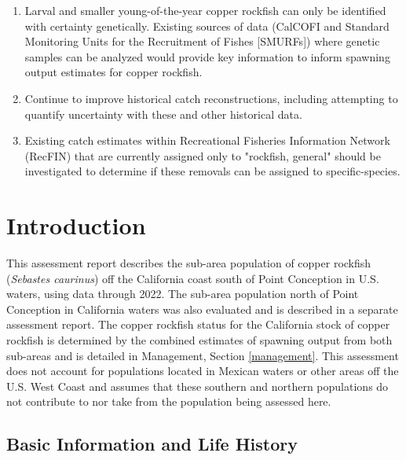 \documentclass[11pt,
  english,
  letterpaper,
]{article}
\begin{document}
\begin{enumerate}
 \item Larval and smaller young-of-the-year copper rockfish can only be identified with certainty genetically. Existing sources of data (CalCOFI and Standard Monitoring Units for the Recruitment of Fishes [SMURFs]) where genetic samples can be analyzed would provide key information to inform spawning output estimates for copper rockfish.
 
  \item Continue to improve historical catch reconstructions, including attempting to quantify uncertainty with these and other historical data.
  
  \item Existing catch estimates within Recreational Fisheries Information Network (RecFIN) that are currently assigned only to "rockfish, general" should be investigated to determine if these removals can be assigned to specific-species.



\end{enumerate}

\pagebreak
\setlength{\parskip}{5mm plus1mm minus1mm}
\setcounter{page}{1}
\renewcommand{\thefigure}{\arabic{figure}}
\renewcommand{\thetable}{\arabic{table}}
\setcounter{table}{0}
\setcounter{figure}{0}

\hypertarget{introduction}{%
\section{Introduction}\label{introduction}}

This assessment report describes the sub-area population of copper rockfish (\emph{Sebastes caurinus}) off the California coast south of Point Conception in U.S. waters, using data through 2022. The sub-area population north of Point Conception in California waters was also evaluated and is described in a separate assessment report. The copper rockfish status for the California stock of copper rockfish is determined by the combined estimates of spawning output from both sub-areas and is detailed in Management, Section \ref{management}. This assessment does not account for populations located in Mexican waters or other areas off the U.S. West Coast and assumes that these southern and northern populations do not contribute to nor take from the population being assessed here.

\hypertarget{basic-information-and-life-history}{%
\subsection{Basic Information and Life History}\label{basic-information-and-life-history}}
\end{document}
